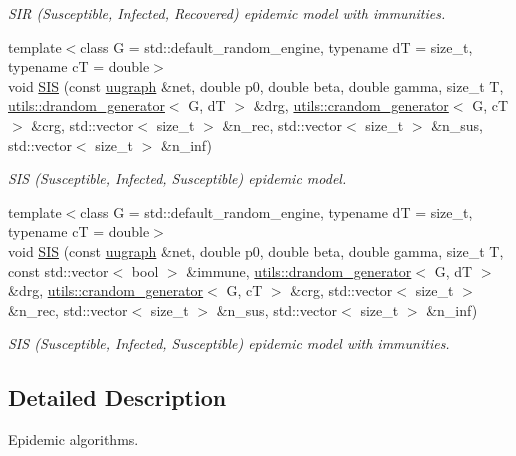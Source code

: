 \begin{DoxyCompactItemize}
\begin{DoxyCompactList}\small\item\em S\+IR (Susceptible, Infected, Recovered) epidemic model with immunities. \end{DoxyCompactList}\item 
{\footnotesize template$<$class G  = std\+::default\+\_\+random\+\_\+engine, typename dT  = size\+\_\+t, typename cT  = double$>$ }\\void \hyperlink{namespacelgraph_1_1networks_1_1epidemics_ab13c06a31d1bb67952af8bada055954a}{S\+IS} (const \hyperlink{classlgraph_1_1uugraph}{uugraph} \&net, double p0, double beta, double gamma, size\+\_\+t T, \hyperlink{classlgraph_1_1utils_1_1drandom__generator}{utils\+::drandom\+\_\+generator}$<$ G, dT $>$ \&drg, \hyperlink{classlgraph_1_1utils_1_1crandom__generator}{utils\+::crandom\+\_\+generator}$<$ G, cT $>$ \&crg, std\+::vector$<$ size\+\_\+t $>$ \&n\+\_\+rec, std\+::vector$<$ size\+\_\+t $>$ \&n\+\_\+sus, std\+::vector$<$ size\+\_\+t $>$ \&n\+\_\+inf)
\begin{DoxyCompactList}\small\item\em S\+IS (Susceptible, Infected, Susceptible) epidemic model. \end{DoxyCompactList}\item 
{\footnotesize template$<$class G  = std\+::default\+\_\+random\+\_\+engine, typename dT  = size\+\_\+t, typename cT  = double$>$ }\\void \hyperlink{namespacelgraph_1_1networks_1_1epidemics_a0ea6c12de2cf4ddf40808ce18de3e91b}{S\+IS} (const \hyperlink{classlgraph_1_1uugraph}{uugraph} \&net, double p0, double beta, double gamma, size\+\_\+t T, const std\+::vector$<$ bool $>$ \&immune, \hyperlink{classlgraph_1_1utils_1_1drandom__generator}{utils\+::drandom\+\_\+generator}$<$ G, dT $>$ \&drg, \hyperlink{classlgraph_1_1utils_1_1crandom__generator}{utils\+::crandom\+\_\+generator}$<$ G, cT $>$ \&crg, std\+::vector$<$ size\+\_\+t $>$ \&n\+\_\+rec, std\+::vector$<$ size\+\_\+t $>$ \&n\+\_\+sus, std\+::vector$<$ size\+\_\+t $>$ \&n\+\_\+inf)
\begin{DoxyCompactList}\small\item\em S\+IS (Susceptible, Infected, Susceptible) epidemic model with immunities. \end{DoxyCompactList}\end{DoxyCompactItemize}


\subsection{Detailed Description}
Epidemic algorithms. 

